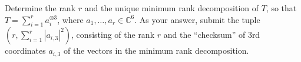 Determine the rank $r$ and the unique minimum rank decomposition of $T$, so that $T = \sum_{i=1}^{r} a_i^{\otimes 3}$, where $a_1,\ldots,a_r \in \mathbb C^{6}$. As your answer, submit the tuple $(r, \sum_{i=1}^r |a_{i,3}|^2)$, consisting of the rank $r$ and the ``checksum'' of $3$rd coordinates $a_{i,3}$ of the vectors in the minimum rank decomposition.
